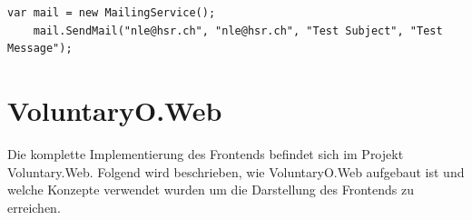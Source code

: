 		\begin{lstlisting}[language=CSharp, caption=Verwendung des MailingService, label=lst:mailingservice, firstnumber=1]
	var mail = new MailingService();
	mail.SendMail("nle@hsr.ch", "nle@hsr.ch", "Test Subject", "Test Message");
	    \end{lstlisting}
    



\section{VoluntaryO.Web}
	Die komplette Implementierung des Frontends befindet sich im Projekt Voluntary.Web. Folgend wird beschrieben, wie VoluntaryO.Web aufgebaut ist und welche Konzepte verwendet wurden um die Darstellung des Frontends zu erreichen.

